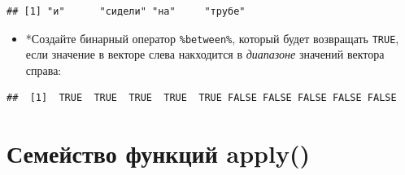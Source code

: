 \documentclass[]{book}
\newenvironment{Shaded}{\begin{snugshade}}{\end{snugshade}}
\newcommand{\KeywordTok}[1]{\textcolor[rgb]{0.13,0.29,0.53}{\textbf{#1}}}
\newcommand{\DataTypeTok}[1]{\textcolor[rgb]{0.13,0.29,0.53}{#1}}
\newcommand{\DecValTok}[1]{\textcolor[rgb]{0.00,0.00,0.81}{#1}}
\newcommand{\StringTok}[1]{\textcolor[rgb]{0.31,0.60,0.02}{#1}}
\newcommand{\ControlFlowTok}[1]{\textcolor[rgb]{0.13,0.29,0.53}{\textbf{#1}}}
\newcommand{\OperatorTok}[1]{\textcolor[rgb]{0.81,0.36,0.00}{\textbf{#1}}}
\newcommand{\NormalTok}[1]{#1}
\providecommand{\tightlist}{%
  \setlength{\itemsep}{0pt}\setlength{\parskip}{0pt}}
\begin{document}
\begin{Shaded}
\end{Shaded}

\begin{verbatim}
## [1] "и"      "сидели" "на"     "трубе"
\end{verbatim}

\begin{itemize}
\tightlist
\item
  *Создайте бинарный оператор \texttt{\%between\%}, который будет
  возвращать \texttt{TRUE}, если значение в векторе слева накходится в
  \emph{диапазоне} значений вектора справа:
\end{itemize}

\begin{Shaded}
\end{Shaded}

\begin{Shaded}
\end{Shaded}

\begin{verbatim}
##  [1]  TRUE  TRUE  TRUE  TRUE  TRUE FALSE FALSE FALSE FALSE FALSE
\end{verbatim}

\section{Семейство функций apply()}\label{solution_apply}
\end{document}
